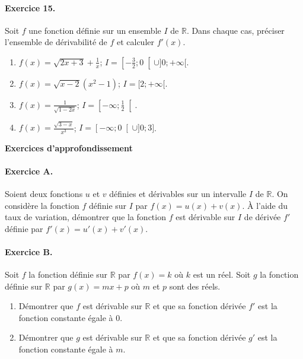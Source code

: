 \documentclass[11pt]{article}
\begin{document}
\paragraph{Exercice 15.}
Soit $f$ une fonction définie sur un ensemble $I$ de $\mathbb{R}$. Dans chaque
cas, préciser l'ensemble de dérivabilité de $f$ et calculer $f'(x)$.
\begin{enumerate}
  \item $f(x)=\sqrt{2x+3}+\frac{1}{x}$;
    $I=\left[-\frac{3}{2};0\right[\cup]0;+\infty[$.
  \item $f(x)=\sqrt{x-2}(x^2-1)$;
    $I=[2;+\infty[$.
    \item $f(x)=\frac{1}{\sqrt{1-2x}}$;
      $I=\left[-\infty;\frac{1}{2}\right[$.
      \item $f(x)=\frac{\sqrt{3-x}}{x^3}$;
    $I=\left[-\infty;0\right[\cup]0;3]$.
\end{enumerate}

\begin{center}
  \LARGE
  \textbf{Exercices d'approfondissement}
\end{center}

\paragraph{Exercice A.}
Soient deux fonctions $u$ et $v$ définies et dérivables sur un intervalle $I$ de
$\mathbb{R}$. On considère la fonction $f$ définie sur $I$ par
$f(x)=u(x)+v(x)$. À l'aide du taux de variation, démontrer que la fonction $f$ est dérivable sur
$I$ de dérivée $f'$ définie par $f'(x)=u'(x)+v'(x)$.

\paragraph{Exercice B.}
Soit $f$ la fonction définie sur $\mathbb{R}$ par $f(x)=k$ où $k$ est un réel.
Soit $g$ la fonction définie sur $\mathbb{R}$ par $g(x)=mx+p$ où $m$ et $p$ sont
des réels.
\begin{enumerate}
  \item Démontrer que $f$ est dérivable sur $\mathbb{R}$ et que sa fonction
    dérivée $f'$ est la fonction constante égale à $0$.
  \item Démontrer que $g$ est dérivable sur $\mathbb{R}$ et que sa fonction
    dérivée $g'$ est la fonction constante égale à $m$.
\end{enumerate}
\end{document}
